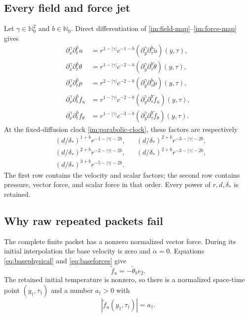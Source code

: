 \subsection{Every field and force jet}

Let $\gamma\in\mathbb N_0^2$ and $b\in\mathbb N_0$.  Direct
differentiation of \eqref{im:field-map}--\eqref{im:force-map} gives
\begin{align}
 \partial_x^\gamma\partial_t^b u
 &=r^{1-|\gamma|}c^{-1-b}
   (\partial_y^\gamma\partial_\tau^b\widetilde u)(y,\tau),
 \label{im:u-jets}\\
 \partial_x^\gamma\partial_t^b \theta
 &=r^{1-|\gamma|}c^{-2-b}
   (\partial_y^\gamma\partial_\tau^b\widetilde\theta)(y,\tau),
 \label{im:theta-jets}\\
 \partial_x^\gamma\partial_t^b p
 &=r^{2-|\gamma|}c^{-2-b}
   (\partial_y^\gamma\partial_\tau^b\widetilde p)(y,\tau),
 \label{im:p-jets}\\
 \partial_x^\gamma\partial_t^b f_u
 &=r^{1-|\gamma|}c^{-2-b}
   (\partial_y^\gamma\partial_\tau^b\widetilde f_u)(y,\tau),
 \label{im:fu-jets}\\
 \partial_x^\gamma\partial_t^b f_\theta
 &=r^{1-|\gamma|}c^{-3-b}
   (\partial_y^\gamma\partial_\tau^b\widetilde f_\theta)(y,\tau).
 \label{im:ftheta-jets}
\end{align}
At the fixed-diffusion clock \eqref{im:parabolic-clock}, these factors
are respectively
\begin{align}
 &(d/\delta_*)^{1+b}r^{-1-|\gamma|-2b},
 &&(d/\delta_*)^{2+b}r^{-3-|\gamma|-2b},
 \label{im:state-powers}\\
 &(d/\delta_*)^{2+b}r^{-2-|\gamma|-2b},
 &&(d/\delta_*)^{2+b}r^{-3-|\gamma|-2b},
 \nonumber\\
 &(d/\delta_*)^{3+b}r^{-5-|\gamma|-2b}.
 \label{im:force-powers}
\end{align}
The first row contains the velocity and scalar factors; the second row
contains pressure, vector force, and scalar force in that order.
Every power of $r,d,\delta_*$ is retained.

\subsection{Why raw repeated packets fail}

The complete finite packet has a nonzero normalized vector force.  During
its initial interpolation the base velocity is zero and
$\dot\alpha=0$.  Equations \eqref{eq:basephysical} and
\eqref{eq:baseforces} give
\[
 \widetilde f_u=-\widetilde\theta_b e_2.
\]
The retained initial temperature is nonzero, so there is a normalized
space-time point $(y_\dagger,\tau_\dagger)$ and a number $a_\dagger>0$
with
\begin{equation}\label{im:nonzero-force}
 |\widetilde f_u(y_\dagger,\tau_\dagger)|=a_\dagger.
\end{equation}

